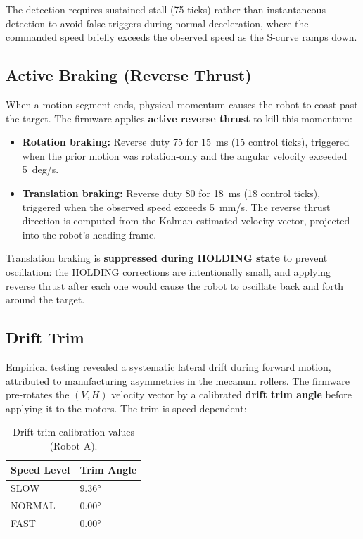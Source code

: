\documentclass[12pt, a4paper, twoside]{article}
\begin{document}
The detection requires sustained stall (75 ticks) rather than instantaneous detection to avoid false triggers during normal deceleration, where the commanded speed briefly exceeds the observed speed as the S-curve ramps down.

\subsection{Active Braking (Reverse Thrust)}

When a motion segment ends, physical momentum causes the robot to coast past the target. The firmware applies \textbf{active reverse thrust} to kill this momentum:

\begin{itemize}
    \item \textbf{Rotation braking:} Reverse duty 75 for \SI{15}{\milli\second} (15 control ticks), triggered when the prior motion was rotation-only and the angular velocity exceeded \SI{5}{deg/s}.
    \item \textbf{Translation braking:} Reverse duty 80 for \SI{18}{\milli\second} (18 control ticks), triggered when the observed speed exceeds \SI{5}{mm/s}. The reverse thrust direction is computed from the Kalman-estimated velocity vector, projected into the robot's heading frame.
\end{itemize}

Translation braking is \textbf{suppressed during HOLDING state} to prevent oscillation: the HOLDING corrections are intentionally small, and applying reverse thrust after each one would cause the robot to oscillate back and forth around the target.

\subsection{Drift Trim}

Empirical testing revealed a systematic lateral drift during forward motion, attributed to manufacturing asymmetries in the mecanum rollers. The firmware pre-rotates the $(V, H)$ velocity vector by a calibrated \textbf{drift trim angle} before applying it to the motors. The trim is speed-dependent:

\begin{table}[H]
    \centering
    \caption{Drift trim calibration values (Robot A).}
    \label{tab:drift-trim}
    \begin{tabular}{@{}ll@{}}
        \toprule
        \textbf{Speed Level} & \textbf{Trim Angle} \\
        \midrule
        SLOW   & $9.36°$ \\
        NORMAL & $0.00°$ \\
        FAST   & $0.00°$ \\
        \bottomrule
    \end{tabular}
\end{table}
\end{document}
